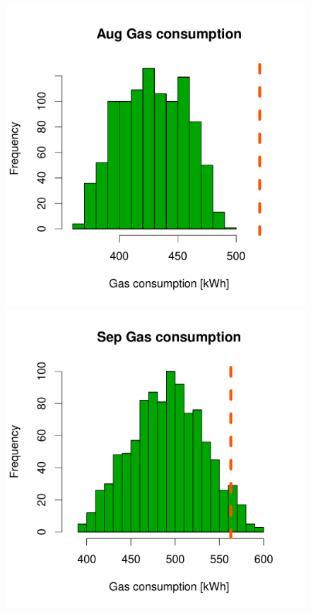 \documentclass[a4paper, 12pt]{article}
\begin{document}
\begin{figure}
 \includegraphics[width=\scale]{Simulation_histograms/Batch_2_Only/Gas_Runs/Aug_Gas}
 \includegraphics[width=\scale]{Simulation_histograms/Batch_2_Only/Gas_Runs/Sep_Gas}\\

\end{figure}
\end{document}
